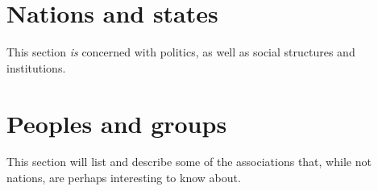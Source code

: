 \documentclass[parskip=full,11pt,%
footheight=38pt]{scrreport}
\begin{document}
\newpage

\section{Nations and states}
This section \textit{is} concerned with politics, as well as social structures and institutions.








\section{Peoples and groups}
This section will list and describe some of the associations that, while not nations, are perhaps interesting to know about.
\end{document}
